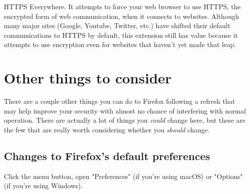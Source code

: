 \documentclass{tufte-handout}
\begin{document}
  HTTPS Everywhere.  It attempts to force your web browser to use HTTPS, the encrypted form of web communication, when it connects to websites.  Although many major sites (Google, Youtube, Twitter, etc.) have shifted their default communications to HTTPS by default, this extension still has value because it attempts to use encryption even for websites that haven't yet made that leap.



\section{Other things to consider}
There are a couple other things you can do to Firefox following a refresh that may help improve your security with almost no chance of interfering with normal operation.  There are actually a lot of things you \emph{could} change here, but these are the few that are really worth considering whether you \emph{should} change.

\subsection{Changes to Firefox's default preferences}
Click the menu button, open "Preferences" (if you're using macOS) or "Options" (if you're using Windows).
\end{document}
